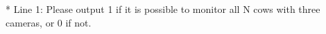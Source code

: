 * Line 1: Please output 1 if it is possible to monitor all N cows with         three cameras, or 0 if not.